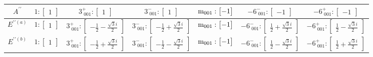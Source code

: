 \documentclass[fleqn,8pt,landscape]{jsarticle}
\begin{document}
\begin{longtable}{ccccccc}
$ A^{\prime\prime} $ & $ 1:\begin{bmatrix} 1 \end{bmatrix} $ & $ 3^{+}_{\,\,001}:\begin{bmatrix} 1 \end{bmatrix} $ & $ 3^{-}_{\,\,001}:\begin{bmatrix} 1 \end{bmatrix} $ & $ {\rm m}_{001}:\begin{bmatrix} -1 \end{bmatrix} $ & $ -6^{-}_{\,\,001}:\begin{bmatrix} -1 \end{bmatrix} $ & $ -6^{+}_{\,\,001}:\begin{bmatrix} -1 \end{bmatrix} $ \\ \hline
$ E^{\prime\prime(a)} $ & $ 1:\begin{bmatrix} 1 \end{bmatrix} $ & $ 3^{+}_{\,\,001}:\begin{bmatrix} - \frac{1}{2} - \frac{\sqrt{3} i}{2} \end{bmatrix} $ & $ 3^{-}_{\,\,001}:\begin{bmatrix} - \frac{1}{2} + \frac{\sqrt{3} i}{2} \end{bmatrix} $ & $ {\rm m}_{001}:\begin{bmatrix} -1 \end{bmatrix} $ & $ -6^{-}_{\,\,001}:\begin{bmatrix} \frac{1}{2} + \frac{\sqrt{3} i}{2} \end{bmatrix} $ & $ -6^{+}_{\,\,001}:\begin{bmatrix} \frac{1}{2} - \frac{\sqrt{3} i}{2} \end{bmatrix} $ \\ \hline
$ E^{\prime\prime(b)} $ & $ 1:\begin{bmatrix} 1 \end{bmatrix} $ & $ 3^{+}_{\,\,001}:\begin{bmatrix} - \frac{1}{2} + \frac{\sqrt{3} i}{2} \end{bmatrix} $ & $ 3^{-}_{\,\,001}:\begin{bmatrix} - \frac{1}{2} - \frac{\sqrt{3} i}{2} \end{bmatrix} $ & $ {\rm m}_{001}:\begin{bmatrix} -1 \end{bmatrix} $ & $ -6^{-}_{\,\,001}:\begin{bmatrix} \frac{1}{2} - \frac{\sqrt{3} i}{2} \end{bmatrix} $ & $ -6^{+}_{\,\,001}:\begin{bmatrix} \frac{1}{2} + \frac{\sqrt{3} i}{2} \end{bmatrix} $ \\
\end{longtable}
\end{document}
